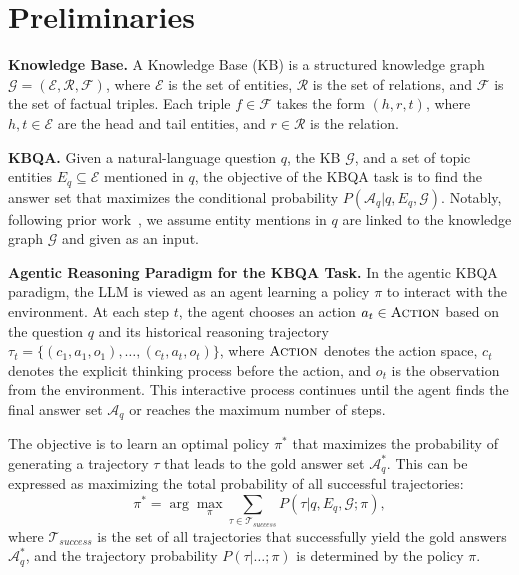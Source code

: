 \section{Preliminaries}\label{sec:prelim}


\textbf{Knowledge Base.}
A Knowledge Base (KB) is a structured knowledge graph $\mathcal{G}=(\mathcal{E},\mathcal{R},\mathcal{F})$, where $\mathcal{E}$ is the set of entities, $\mathcal{R}$ is the set of relations, and $\mathcal{F}$ is the set of factual triples. Each triple $f \in \mathcal{F}$ takes the form $(h,r,t)$, where $h, t \in \mathcal{E}$ are the head and tail entities, and $r \in \mathcal{R}$ is the relation.

\textbf{KBQA.}
Given a natural-language question $q$, the KB $\mathcal{G}$, and a set of topic entities $E_q\subseteq\mathcal{E}$ mentioned in $q$, the objective of the KBQA task is to find the answer set that maximizes the conditional probability $P(\mathcal{A}_q | q, E_q, \mathcal{G})$. 
Notably, following prior work~\cite{luokbqao1}, we assume entity mentions in $q$ are linked to the knowledge graph $\mathcal{G}$ and given as an input.

\textbf{Agentic Reasoning Paradigm for the KBQA Task.}
In the agentic KBQA paradigm, the LLM is viewed as an agent learning a policy $\pi$ to interact with the environment. At each step $t$, the agent chooses an action $a_t \in \textsc{Action}$ based on the question $q$ and its historical reasoning trajectory $\tau_t = \{(c_1,a_1,o_1),\ldots,(c_{t},a_{t},o_{t})\}$, where $\textsc{Action}$ denotes the action space, $c_t$ denotes the explicit thinking process before the action, and $o_t$ is the observation from the environment. This interactive process continues until the agent finds the final answer set $\mathcal{A}_q$ or reaches the maximum number of steps.

The objective is to learn an optimal policy $\pi^*$ that maximizes the probability of generating a trajectory $\tau$ that leads to the gold answer set $\mathcal{A}^*_q$. This can be expressed as maximizing the total probability of all successful trajectories:
\begin{equation}
\pi^* = \arg\max_{\pi} \sum_{\tau \in \mathcal{T}_{success}} P(\tau | q, E_q, \mathcal{G}; \pi),
\end{equation}
where $\mathcal{T}_{success}$ is the set of all trajectories that successfully yield the gold answers $\mathcal{A}^*_q$, and the trajectory probability $P(\tau | \dots; \pi)$ is determined by the policy $\pi$.